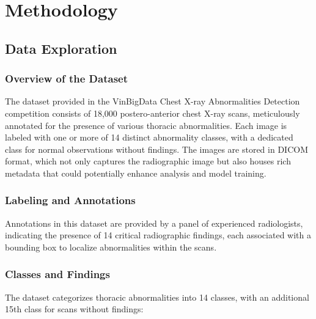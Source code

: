 \documentclass[12pt,oneside]{book} %
\begin{document}
\chapter{Methodology}

\section{Data Exploration}

\subsection{Overview of the Dataset}

The dataset provided in the VinBigData Chest X-ray Abnormalities Detection
competition consists of 18,000 postero-anterior chest X-ray scans, meticulously
annotated for the presence of various thoracic abnormalities. Each image is
labeled with one or more of 14 distinct abnormality classes, with a dedicated
class for normal observations without findings. The images are stored in DICOM
format, which not only captures the radiographic image but also houses rich
metadata that could potentially enhance analysis and model training.

\subsection{Labeling and Annotations}

Annotations in this dataset are provided by a panel of experienced
radiologists, indicating the presence of 14 critical radiographic findings,
each associated with a bounding box to localize abnormalities within the scans. 

\subsection{Classes and Findings}

The dataset categorizes thoracic abnormalities into 14 classes, with an
additional 15th class for scans without findings:
\end{document}
